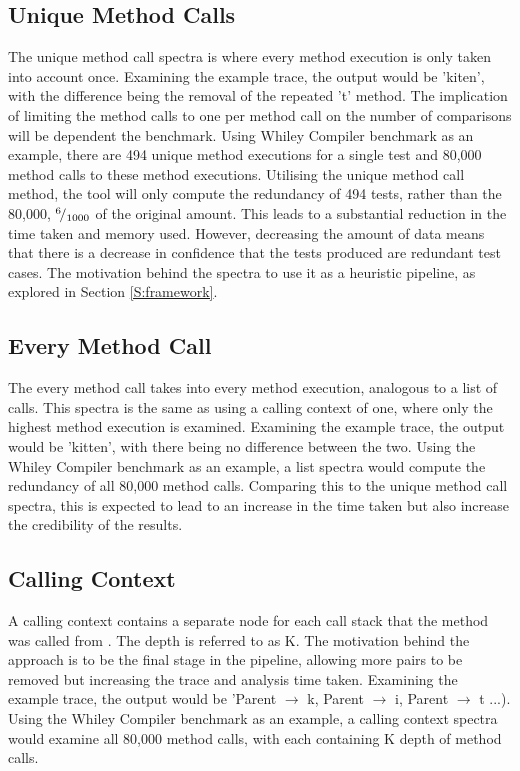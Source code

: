 \subsection{Unique Method Calls}
The unique method call spectra is where every method execution is only taken into account once. Examining the example trace, the output would be 'kiten', with the difference being the removal of the repeated 't' method. The implication of limiting the method calls to one per method call on the number of comparisons will be dependent the benchmark. Using Whiley Compiler benchmark as an example, there are 494 unique method executions for a single test and 80,000 method calls to these method executions. Utilising the unique method call method, the tool will only compute the redundancy of 494 tests, rather than the 80,000, ${}^{6}\!/_{1000}$ of the original amount. This leads to a substantial reduction in the time taken and memory used. However, decreasing the amount of data means that there is a decrease in confidence that the tests produced are redundant test cases. The motivation behind the spectra to use it as a heuristic pipeline, as explored in Section \ref{S:framework}.

\subsection{Every Method Call}
The every method call takes into every method execution, analogous to a list of calls. This spectra is the same as using a calling context of one, where only the highest method execution is examined. Examining the example trace, the output would be 'kitten', with there being no difference between the two. Using the Whiley Compiler benchmark as an example, a list spectra would compute the redundancy of all 80,000 method calls. Comparing this to the unique method call spectra, this is expected to lead to an increase in the time taken but also increase the credibility of the results. 

\subsection{Calling Context}
A calling context contains a separate node for each call stack that the method was called from \cite{callingcontext}. The depth is referred to as K. The motivation behind the approach is to be the final stage in the pipeline, allowing more pairs to be removed but increasing the trace and analysis time taken. Examining the example trace, the output would be 'Parent $\rightarrow$ k, Parent $\rightarrow$ i, Parent $\rightarrow$ t ...). Using the Whiley Compiler benchmark as an example, a calling context spectra would examine all 80,000 method calls, with each containing K depth of method calls. 

